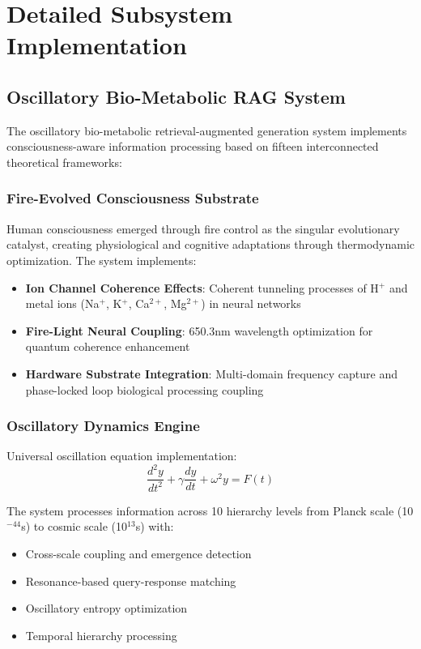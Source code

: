 \documentclass[11pt,a4paper]{article}
\begin{document}
\section{Detailed Subsystem Implementation}

\subsection{Oscillatory Bio-Metabolic RAG System}

The oscillatory bio-metabolic retrieval-augmented generation system implements consciousness-aware information processing based on fifteen interconnected theoretical frameworks:

\subsubsection{Fire-Evolved Consciousness Substrate}

Human consciousness emerged through fire control as the singular evolutionary catalyst, creating physiological and cognitive adaptations through thermodynamic optimization. The system implements:

\begin{itemize}
\item \textbf{Ion Channel Coherence Effects}: Coherent tunneling processes of H$^+$ and metal ions (Na$^+$, K$^+$, Ca$^{2+}$, Mg$^{2+}$) in neural networks
\item \textbf{Fire-Light Neural Coupling}: 650.3nm wavelength optimization for quantum coherence enhancement
\item \textbf{Hardware Substrate Integration}: Multi-domain frequency capture and phase-locked loop biological processing coupling
\end{itemize}

\subsubsection{Oscillatory Dynamics Engine}

Universal oscillation equation implementation:
\begin{equation}
\frac{d^2y}{dt^2} + \gamma\frac{dy}{dt} + \omega^2y = F(t)
\end{equation}

The system processes information across 10 hierarchy levels from Planck scale (10$^{-44}$s) to cosmic scale (10$^{13}$s) with:
\begin{itemize}
\item Cross-scale coupling and emergence detection
\item Resonance-based query-response matching
\item Oscillatory entropy optimization
\item Temporal hierarchy processing
\end{itemize}
\end{document}
